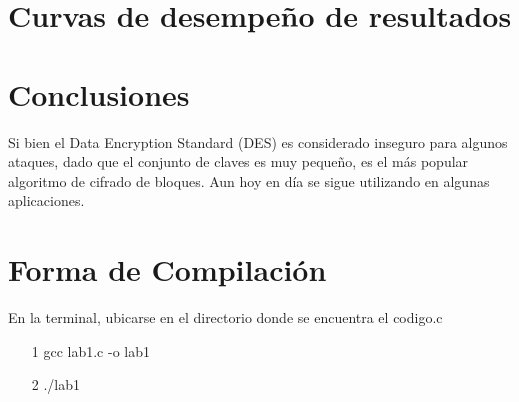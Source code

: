 \documentclass{report}
\begin{document}
\section{Curvas de desempe\~no de resultados}
\begin{center}
\end{center}
%
\section{Conclusiones}
Si bien el Data Encryption Standard (DES) es considerado inseguro para algunos ataques, dado que el conjunto de claves es muy peque\~no, es el m\'as popular algoritmo de cifrado de bloques. Aun hoy en d\'ia se sigue utilizando en algunas aplicaciones.
%
\section{Forma de Compilaci\'on}
En la terminal, ubicarse en el directorio donde se encuentra el codigo.c
\begin{itemize}
\item[1] gcc lab1.c -o lab1
\item[2] ./lab1
\end{itemize}
%
\end{document}
